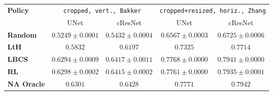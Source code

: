 \begin{tabular}{lcccc}
    \toprule
    
   \multirow{2}{*}{\textbf{Policy}}& \multicolumn{2}{c}{\texttt{cropped, vert., Bakker}} & \multicolumn{2}{c}{\texttt{cropped+resized, horiz., Zhang}}\\
   \cmidrule(l){2-3} \cmidrule(l){4-5}
   & UNet  & cResNet & UNet  & cResNet \\
   \midrule
   \textbf{Random}  &  $0.5249\pm 0.0001$  & $0.5432\pm 0.0004$ &$0.6567\pm 0.0003$&$0.6725\pm 0.0006$ \\
   \textbf{LtH}  & $0.5832$                & $0.6197$ & $0.7325$ &$0.7714$ \\
   \textbf{LBCS}  & $0.6294\pm0.0009$      & $\mathbf{0.6417\pm 0.0011}$& $\mathbf{0.7768\pm 0.0000}$ &$\mathbf{0.7941 \pm 0.0000}$\\
   \textbf{RL} & $\mathbf{0.6298\pm 0.0002}$        & $\mathbf{0.6415\pm 0.0002}$ &$0.7761 \pm 0.0000$&$0.7935\pm 0.0001$\\
   \midrule
   \textbf{NA Oracle}  & $0.6301$          & $0.6428$          & $0.7771$    &$0.7942$\\
   
   \bottomrule
   \end{tabular}
   
   